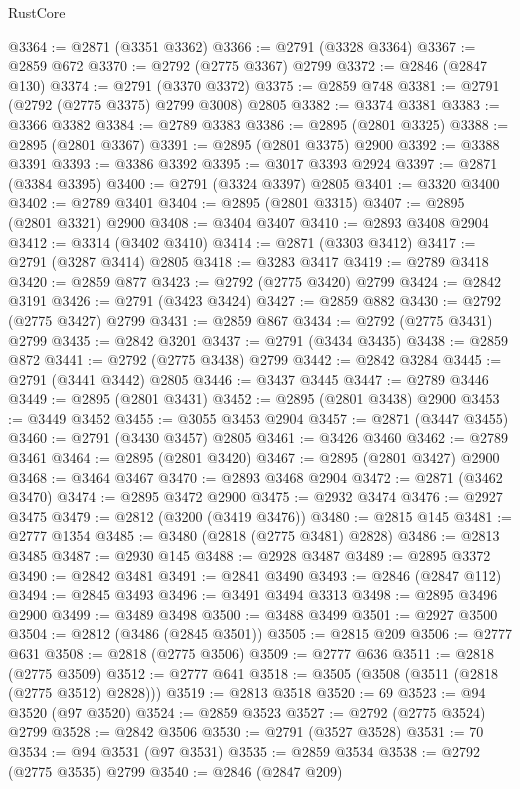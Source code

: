 \begin{lexlean}{RustCore}
\begin{coremodule}
@3364 := @2871 (@3351 @3362)
@3366 := @2791 (@3328 @3364)
@3367 := @2859 @672
@3370 := @2792 (@2775 @3367) @2799
@3372 := @2846 (@2847 @130)
@3374 := @2791 (@3370 @3372)
@3375 := @2859 @748
@3381 := @2791 (@2792 (@2775 @3375) @2799 @3008) @2805
@3382 := @3374 @3381
@3383 := @3366 @3382
@3384 := @2789 @3383
@3386 := @2895 (@2801 @3325)
@3388 := @2895 (@2801 @3367)
@3391 := @2895 (@2801 @3375) @2900
@3392 := @3388 @3391
@3393 := @3386 @3392
@3395 := @3017 @3393 @2924
@3397 := @2871 (@3384 @3395)
@3400 := @2791 (@3324 @3397) @2805
@3401 := @3320 @3400
@3402 := @2789 @3401
@3404 := @2895 (@2801 @3315)
@3407 := @2895 (@2801 @3321) @2900
@3408 := @3404 @3407
@3410 := @2893 @3408 @2904
@3412 := @3314 (@3402 @3410)
@3414 := @2871 (@3303 @3412)
@3417 := @2791 (@3287 @3414) @2805
@3418 := @3283 @3417
@3419 := @2789 @3418
@3420 := @2859 @877
@3423 := @2792 (@2775 @3420) @2799
@3424 := @2842 @3191
@3426 := @2791 (@3423 @3424)
@3427 := @2859 @882
@3430 := @2792 (@2775 @3427) @2799
@3431 := @2859 @867
@3434 := @2792 (@2775 @3431) @2799
@3435 := @2842 @3201
@3437 := @2791 (@3434 @3435)
@3438 := @2859 @872
@3441 := @2792 (@2775 @3438) @2799
@3442 := @2842 @3284
@3445 := @2791 (@3441 @3442) @2805
@3446 := @3437 @3445
@3447 := @2789 @3446
@3449 := @2895 (@2801 @3431)
@3452 := @2895 (@2801 @3438) @2900
@3453 := @3449 @3452
@3455 := @3055 @3453 @2904
@3457 := @2871 (@3447 @3455)
@3460 := @2791 (@3430 @3457) @2805
@3461 := @3426 @3460
@3462 := @2789 @3461
@3464 := @2895 (@2801 @3420)
@3467 := @2895 (@2801 @3427) @2900
@3468 := @3464 @3467
@3470 := @2893 @3468 @2904
@3472 := @2871 (@3462 @3470)
@3474 := @2895 @3472 @2900
@3475 := @2932 @3474
@3476 := @2927 @3475
@3479 := @2812 (@3200 (@3419 @3476))
@3480 := @2815 @145
@3481 := @2777 @1354
@3485 := @3480 (@2818 (@2775 @3481) @2828)
@3486 := @2813 @3485
@3487 := @2930 @145
@3488 := @2928 @3487
@3489 := @2895 @3372
@3490 := @2842 @3481
@3491 := @2841 @3490
@3493 := @2846 (@2847 @112)
@3494 := @2845 @3493
@3496 := @3491 @3494 @3313
@3498 := @2895 @3496 @2900
@3499 := @3489 @3498
@3500 := @3488 @3499
@3501 := @2927 @3500
@3504 := @2812 (@3486 (@2845 @3501))
@3505 := @2815 @209
@3506 := @2777 @631
@3508 := @2818 (@2775 @3506)
@3509 := @2777 @636
@3511 := @2818 (@2775 @3509)
@3512 := @2777 @641
@3518 := @3505 (@3508 (@3511 (@2818 (@2775 @3512) @2828)))
@3519 := @2813 @3518
@3520 := 69
@3523 := @94 @3520 (@97 @3520)
@3524 := @2859 @3523
@3527 := @2792 (@2775 @3524) @2799
@3528 := @2842 @3506
@3530 := @2791 (@3527 @3528)
@3531 := 70
@3534 := @94 @3531 (@97 @3531)
@3535 := @2859 @3534
@3538 := @2792 (@2775 @3535) @2799
@3540 := @2846 (@2847 @209)

\end{coremodule}
\end{lexlean}
